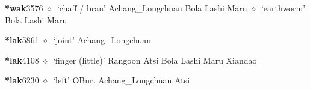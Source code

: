   \begin{list}{}{\leftmargin=1.5em \itemindent=-1.5em}
  \item {\footnotesize \textbf{*wak}}{\tiny 3576}
         $\diamond$~`chaff / bran'
         Achang\_Longchuan 
\hspace{1ex}
         Bola 
\hspace{1ex}
         Lashi 
\hspace{1ex}
         Maru 
\hspace{1ex}
         $\diamond$~`earthworm'
         Bola 
\hspace{1ex}
         Lashi 
\hspace{1ex}
         Maru 
  \item {\footnotesize \textbf{*lak}}{\tiny 5861}
\hspace{1ex}
         $\diamond$~`joint'
         Achang\_Longchuan 
  \item {\footnotesize \textbf{*lak}}{\tiny 4108}
\hspace{1ex}
         $\diamond$~`finger (little)'
         Rangoon 
\hspace{1ex}
         Atsi 
\hspace{1ex}
         Bola 
\hspace{1ex}
         Lashi 
\hspace{1ex}
         Maru 
\hspace{1ex}
         Xiandao 
  \item {\footnotesize \textbf{*lak}}{\tiny 6230}
\hspace{1ex}
         $\diamond$~`left'
         OBur. 
\hspace{1ex}
         Achang\_Longchuan 
\hspace{1ex}
         Atsi 

\end{list}
